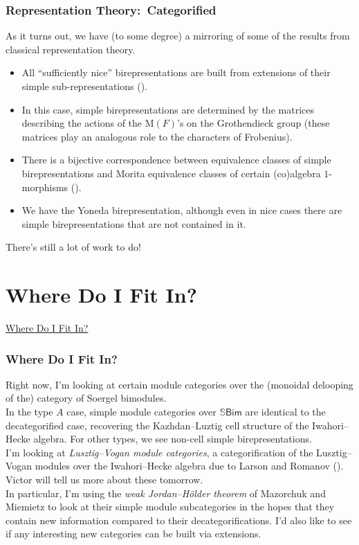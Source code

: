\documentclass{beamer}
\newcommand{\textcat}[1]{\mathrm{\textsf{#1}}}
\newcommand*{\emphasis}[1]{\textcolor{structure}{\em #1}}
\begin{document}
\begin{frame}
\frametitle{Representation Theory:\ Categorified}
As it turns out, we have (to some degree) a mirroring of some of the results from classical representation theory.\\[2ex]
\begin{itemize}
\item All ``sufficiently nice'' birepresentations are built from extensions of their simple sub-representations (\textcolor{structure}{\cite{MM16}}).
\item In this case, simple birepresentations are determined by the matrices describing the actions of the $\mathrm{M}(F)$'s on the Grothendieck group (these matrices play an analogous role to the characters of Frobenius).
\item There is a bijective correspondence between equivalence classes of simple birepresentations and Morita equivalence classes of certain (co)algebra $1$-morphisms (\textcolor{structure}{\cite{MMMT19}}).
\item We have the Yoneda birepresentation, although even in nice cases there are simple birepresentations that are not contained in it.\\[2ex]
\end{itemize}
There's still a lot of work to do!
\end{frame}


\section{Where Do I Fit In?}

\begin{frame}
\centerline{\huge\textcolor{structure}{\underline{Where Do I Fit In?}}}
\end{frame}

\begin{frame}
\frametitle{Where Do I Fit In?}
Right now, I'm looking at certain module categories over the (monoidal delooping of the) category of Soergel bimodules.\\[2ex]
In the type $A$ case, simple module categories over $\mathbb{S}\textcat{Bim}$ are identical to the decategorified case, recovering the Kazhdan--Luztig cell structure of the Iwahori--Hecke algebra. For other types, we see non-cell simple birepresentations.\\[2ex]
I'm looking at \emphasis{Lusztig--Vogan module categories}, a categorification of the Lusztig--Vogan modules over the Iwahori--Hecke algebra due to Larson and Romanov (\textcolor{structure}{\cite{LR22}}). Victor will tell us more about these tomorrow.\\[2ex]
In particular, I'm using the \emphasis{weak Jordan--H\"{o}lder theorem} of Mazorchuk and Miemietz  to look at their simple module subcategories in the hopes that they contain new information compared to their decategorifications. I'd also like to see if any interesting new categories can be built via extensions.
\end{frame}
\end{document}
